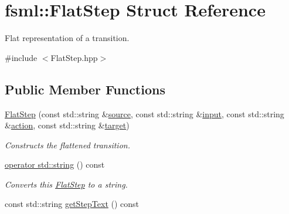 \hypertarget{structfsml_1_1FlatStep}{\section{fsml\-:\-:Flat\-Step Struct Reference}
\label{structfsml_1_1FlatStep}
}


Flat representation of a transition.  




{\ttfamily \#include $<$Flat\-Step.\-hpp$>$}

\subsection*{Public Member Functions}
\begin{DoxyCompactItemize}
\item 
\hyperlink{structfsml_1_1FlatStep_a2056fa8fd3e527dd04fffb7011fe3d16}{Flat\-Step} (const std\-::string \&\hyperlink{structfsml_1_1FlatStep_a0d750cd9f657776ffc88627a44d9fdf6}{source}, const std\-::string \&\hyperlink{structfsml_1_1FlatStep_a69f42f7f8091dff898b7944a12cb563e}{input}, const std\-::string \&\hyperlink{structfsml_1_1FlatStep_a910a78d294c31aea42fc23babd361cdb}{action}, const std\-::string \&\hyperlink{structfsml_1_1FlatStep_a2a4242c4ad9b86ce6e1fc638ed4427be}{target})
\begin{DoxyCompactList}\small\item\em Constructs the flattened transition. \end{DoxyCompactList}\item 
\hyperlink{structfsml_1_1FlatStep_aa855ca1535e6dbffb556ee28bd91779f}{operator std\-::string} () const 
\begin{DoxyCompactList}\small\item\em Converts this \hyperlink{structfsml_1_1FlatStep}{Flat\-Step} to a string. \end{DoxyCompactList}\item 
const std\-::string \hyperlink{structfsml_1_1FlatStep_a264b67de20cbd29b079aa46cc332f336}{get\-Step\-Text} () const 
\end{DoxyCompactItemize}
